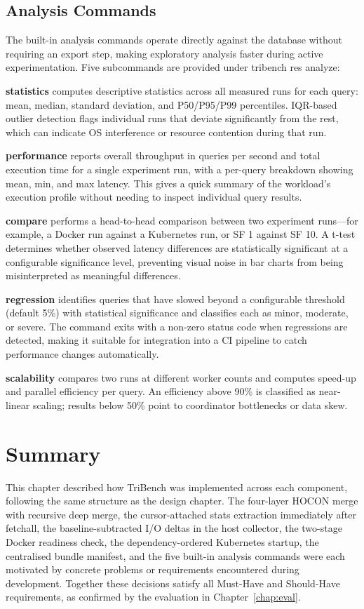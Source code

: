\documentclass{l4proj}
\begin{document}
\subsection{Analysis Commands}
\label{sec:impl_analysis}

The built-in analysis commands operate directly against the database without requiring an export step, making exploratory analysis faster during active experimentation. Five subcommands are provided under tribench res analyze:

\textbf{statistics} computes descriptive statistics across all measured runs for each query: mean, median, standard deviation, and P50/P95/P99 percentiles. IQR-based outlier detection flags individual runs that deviate significantly from the rest, which can indicate OS interference or resource contention during that run.

\textbf{performance} reports overall throughput in queries per second and total execution time for a single experiment run, with a per-query breakdown showing mean, min, and max latency. This gives a quick summary of the workload's execution profile without needing to inspect individual query results.

\textbf{compare} performs a head-to-head comparison between two experiment runs---for example, a Docker run against a Kubernetes run, or SF 1 against SF 10. A t-test determines whether observed latency differences are statistically significant at a configurable significance level, preventing visual noise in bar charts from being misinterpreted as meaningful differences.

\textbf{regression} identifies queries that have slowed beyond a configurable threshold (default 5\%) with statistical significance and classifies each as minor, moderate, or severe. The command exits with a non-zero status code when regressions are detected, making it suitable for integration into a CI pipeline to catch performance changes automatically.

\textbf{scalability} compares two runs at different worker counts and computes speed-up and parallel efficiency per query. An efficiency above 90\% is classified as near-linear scaling; results below 50\% point to coordinator bottlenecks or data skew.

\section{Summary}
\label{sec:impl_summary}

This chapter described how TriBench was implemented across each component, following the same structure as the design chapter. The four-layer HOCON merge with recursive deep merge, the cursor-attached stats extraction immediately after fetchall, the baseline-subtracted I/O deltas in the host collector, the two-stage Docker readiness check, the dependency-ordered Kubernetes startup, the centralised bundle manifest, and the five built-in analysis commands were each motivated by concrete problems or requirements encountered during development. Together these decisions satisfy all Must-Have and Should-Have requirements, as confirmed by the evaluation in Chapter~\ref{chap:eval}.
\end{document}
